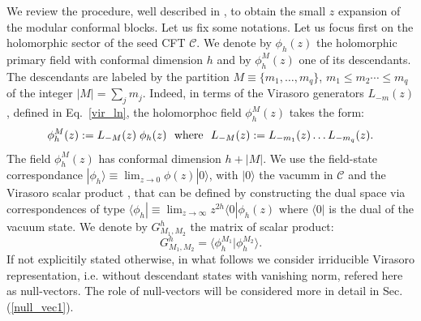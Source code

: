 \documentclass[a4paper,11pt]{article}
\begin{document}
\noindent We review the procedure, well described in \cite{Collier}, to obtain the small $z$ expansion  of  the modular conformal blocks.  Let us fix some notations. Let us focus first on the holomorphic sector of the seed CFT $\mathcal{C}$. We denote by $\phi_{h}(z)$  the holomorphic primary field with conformal dimension $h$  and by $\phi_{h}^{M}(z)$ one of its descendants. The descendants are labeled by the partition  $M\equiv\{m_1,\dots,m_q\}$, $m_1\leq m_2\cdots\leq m_q$ of the integer  $|M|=\sum_{j} m_j$. Indeed, in terms of the  Virasoro generators $L_{-m}(z)$, defined in Eq.~\eqref{vir_ln}, the holomorphoc field $\phi_{h}^{M}(z)$ takes the form:
\begin{equation}
\label{desc}
 \phi_{h}^{M}(z):=L_{-M}(z)\;\phi_h(z)~~{\rm{where}}~~ L_{-M}(z):=L_{-m_1}(z)\dots L_{-m_q}(z).
 \end{equation}
The field  $\phi_{h}^{M}(z)$ has conformal dimension $h+|M|$. We use the field-state correspondance $|\phi_{h}\rangle\equiv \lim_{z\to 0}\phi(z)|0\rangle$, with $|0\rangle$ the vacumm in $\mathcal{C}$ and the Virasoro scalar product \cite{DiFrancesco}, that can be defined  by constructing the dual space  via correspondences of type  $\langle \phi_{h} |\equiv\lim_{z\rightarrow\infty}z^{2h}\langle 0|\phi_h(z)$ where $\langle 0|$ is the dual of the vacuum state. We denote by  $G^{h}_{M_1,M_2}$ the matrix of scalar product:
\begin{equation}
G^{h}_{M_1,M_2} = \langle \phi_{h}^{M_1}|\phi_{h}^{M_2}\rangle. 
\end{equation}
If not explicitily stated otherwise, in what follows we consider irriducible Virasoro representation, i.e. without descendant states with vanishing norm, refered here as null-vectors. The role of null-vectors will be considered more in detail in Sec. (\ref{null_vec1}).  
\end{document}
